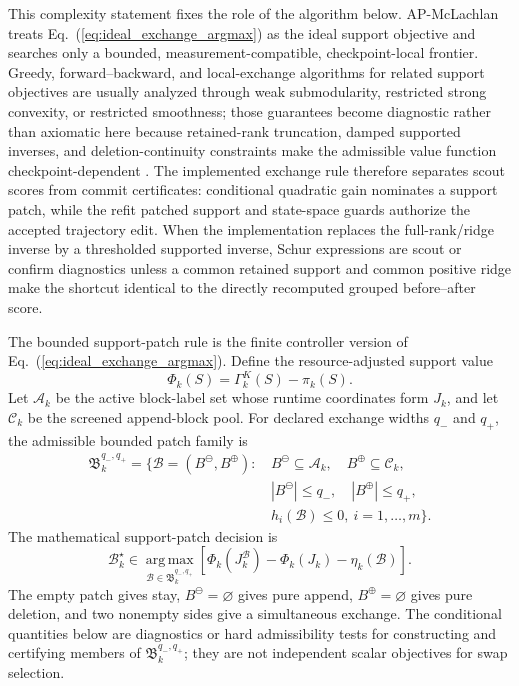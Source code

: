 \documentclass[
  reprint,
  amsmath,
  amssymb,
  aps,
  pra,
  nofootinbib,
  superscriptaddress,
  floatfix
]{revtex4-2}
\begin{document}
This complexity statement fixes the role of the algorithm below.  AP-McLachlan treats Eq.~(\ref{eq:ideal_exchange_argmax}) as the ideal support objective and searches only a bounded, measurement-compatible, checkpoint-local frontier.  Greedy, forward--backward, and local-exchange algorithms for related support objectives are usually analyzed through weak submodularity, restricted strong convexity, or restricted smoothness; those guarantees become diagnostic rather than axiomatic here because retained-rank truncation, damped supported inverses, and deletion-continuity constraints make the admissible value function checkpoint-dependent \cite{DasKempe2011,Elenberg2018WeakSubmodularity}.  The implemented exchange rule therefore separates scout scores from commit certificates: conditional quadratic gain nominates a support patch, while the refit patched support and state-space guards authorize the accepted trajectory edit.  When the implementation replaces the full-rank/ridge inverse by a thresholded supported inverse, Schur expressions are scout or confirm diagnostics unless a common retained support and common positive ridge make the shortcut identical to the directly recomputed grouped before--after score.

The bounded support-patch rule is the finite controller version of
Eq.~(\ref{eq:ideal_exchange_argmax}).  Define the resource-adjusted support value
\begin{equation}
\Phi_k(S)=\Gamma_k^K(S)-\pi_k(S).
\label{eq:bounded_patch_phi}
\end{equation}
Let \(\mathcal A_k\) be the active block-label set whose runtime coordinates
form \(J_k\), and let \(\mathcal C_k\) be the screened append-block pool.  For
declared exchange widths \(q_-\) and \(q_+\), the admissible bounded patch family
is
\begin{equation}
\begin{aligned}
\mathfrak B_k^{q_-,q_+}
=
\bigl\{
\mathcal B=(B^{\ominus},B^{\oplus}):\,
&B^{\ominus}\subseteq\mathcal A_k,\quad
B^{\oplus}\subseteq\mathcal C_k,\\
&|B^{\ominus}|\le q_-,\quad |B^{\oplus}|\le q_+,\\
&h_i(\mathcal B)\le0,\ i=1,\ldots,m
\bigr\}.
\end{aligned}
\label{eq:bounded_patch_family}
\end{equation}
The mathematical support-patch decision is
\begin{equation}
\mathcal B_k^\star
\in
\operatorname*{arg\,max}_{\mathcal B\in\mathfrak B_k^{q_-,q_+}}
\left[
\Phi_k(J_k^{\mathcal B})-\Phi_k(J_k)-\eta_k(\mathcal B)
\right].
\label{eq:bounded_patch_argmax}
\end{equation}
The empty patch gives stay, \(B^{\ominus}=\varnothing\) gives pure append,
\(B^{\oplus}=\varnothing\) gives pure deletion, and two nonempty sides give a
simultaneous exchange.  The conditional quantities below are diagnostics or hard
admissibility tests for constructing and certifying members of
\(\mathfrak B_k^{q_-,q_+}\); they are not independent scalar objectives for
swap selection.
\end{document}
